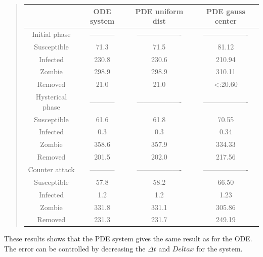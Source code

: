 \documentclass[%
twoside,                 %
final,                   %
10pt]{article}
\begin{document}
\label{table:compare_phases_zombie}

\begin{quote}
\begin{tabular}{cccc}
\hline
\multicolumn{1}{c}{  } & \multicolumn{1}{c}{ ODE system } & \multicolumn{1}{c}{ PDE uniform dist } & \multicolumn{1}{c}{ PDE gauss center } \\
\hline
Initial phase       & -----------         & ------------------- & ------------------- \\
\hline
Susceptible         & 71.3                & 71.5                & 81.12               \\
Infected            & 230.8               & 230.6               & 210.94              \\
Zombie              & 298.9               & 298.9               & 310.11              \\
Removed             & 21.0                & 21.0                & <:20.60             \\
\hline
Hysterical phase    & -----------         & ------------------- & ------------------- \\
\hline
Susceptible         & 61.6                & 61.8                & 70.55               \\
Infected            & 0.3                 & 0.3                 & 0.34                \\
Zombie              & 358.6               & 357.9               & 334.33              \\
Removed             & 201.5               & 202.0               & 217.56              \\
\hline
Counter attack      & -----------         & ------------------- & ------------------- \\
\hline
Susceptible         & 57.8                & 58.2                & 66.50               \\
Infected            & 1.2                 & 1.2                 & 1.23                \\
Zombie              & 331.8               & 331.1               & 305.86              \\
Removed             & 231.3               & 231.7               & 249.19              \\
\hline
\end{tabular}
\end{quote}

\noindent
These results shows that the PDE system gives the same result as for the ODE. The error can be controlled by decreasing the $\Delta t$ and $Delta x$ for the system. 
\end{document}
